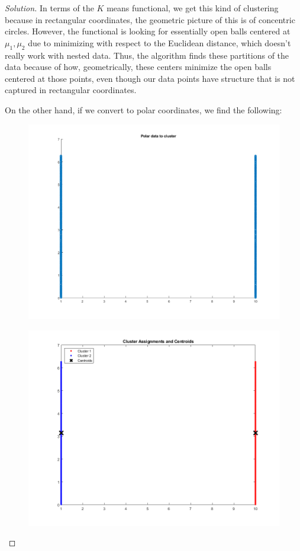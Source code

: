 \documentclass[10pt]{article}
\begin{document}
\begin{proof}[Solution]
In terms of the $K$ means functional, we get this kind of clustering because in rectangular coordinates, the geometric picture of this is of concentric circles. However, the functional is looking for essentially open balls centered at $\mu_1, \mu_2$ due to minimizing with respect to the Euclidean distance, which doesn't really work with nested data. Thus, the algorithm finds these partitions of the data because of how, geometrically, these centers minimize the open balls centered at those points, even though our data points have structure that is not captured in rectangular coordinates.

On the other hand, if we convert to polar coordinates, we find the following:

\begin{figure}[H]
\centering
\begin{minipage}{.5\textwidth}
  \centering
  \includegraphics[width=\linewidth]{polar_circular_data}
  \label{fig:test1}
\end{minipage}%
\begin{minipage}{.5\textwidth}
  \centering
  \includegraphics[width=\linewidth]{polar_cluster_assignments}

\end{minipage}
\end{figure}
\end{proof}
\end{document}

